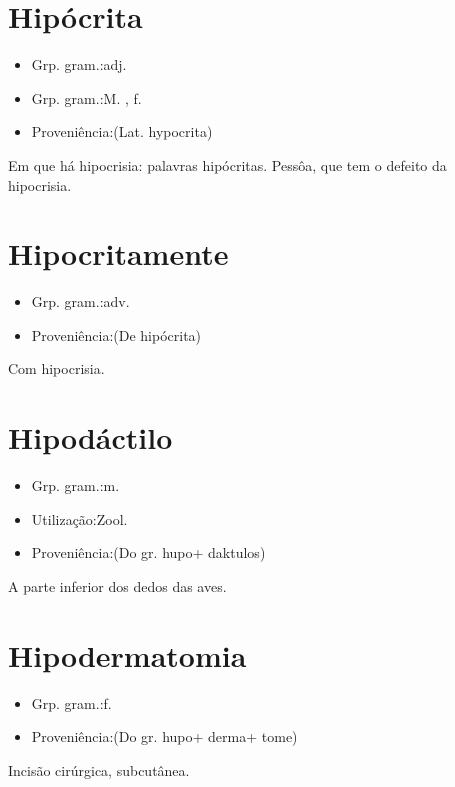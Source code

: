 \documentclass{article}
\begin{document}
\section{Hipócrita}
\begin{itemize}
\item {Grp. gram.:adj.}
\end{itemize}
\begin{itemize}
\item {Grp. gram.:M. ,  f.}
\end{itemize}
\begin{itemize}
\item {Proveniência:(Lat. \textunderscore hypocrita\textunderscore )}
\end{itemize}
Em que há hipocrisia: \textunderscore palavras hipócritas\textunderscore .
Pessôa, que tem o defeito da hipocrisia.
\section{Hipocritamente}
\begin{itemize}
\item {Grp. gram.:adv.}
\end{itemize}
\begin{itemize}
\item {Proveniência:(De \textunderscore hipócrita\textunderscore )}
\end{itemize}
Com hipocrisia.
\section{Hipodáctilo}
\begin{itemize}
\item {Grp. gram.:m.}
\end{itemize}
\begin{itemize}
\item {Utilização:Zool.}
\end{itemize}
\begin{itemize}
\item {Proveniência:(Do gr. \textunderscore hupo\textunderscore  + \textunderscore daktulos\textunderscore )}
\end{itemize}
A parte inferior dos dedos das aves.
\section{Hipodermatomia}
\begin{itemize}
\item {Grp. gram.:f.}
\end{itemize}
\begin{itemize}
\item {Proveniência:(Do gr. \textunderscore hupo\textunderscore  + \textunderscore derma\textunderscore  + \textunderscore tome\textunderscore )}
\end{itemize}
Incisão cirúrgica, subcutânea.
\end{document}
